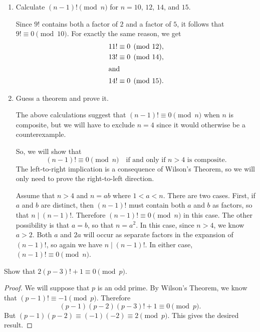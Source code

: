 \begin{enumerate}
\item Calculate $(n - 1)!\pmod{n}$ for $n = 10$, $12$, $14$, and $15$.
  \begin{solution}
    Since $9!$ contains both a factor of $2$ and a factor of $5$, it
    follows that $9!\equiv0\pmod{10}$. For exactly the same reason, we
    get
    \begin{align*}
      11!&\equiv0\pmod{12}, \\
      13!&\equiv0\pmod{14}, \\
      \intertext{and}
      14!&\equiv0\pmod{15}. \qedhere
    \end{align*}
  \end{solution}
\item Guess a theorem and prove it.
  \begin{solution}
    The above calculations suggest that $(n - 1)!\equiv0\pmod{n}$ when
    $n$ is composite, but we will have to exclude $n = 4$ since it
    would otherwise be a counterexample.

    So, we will show that
    \begin{equation*}
      (n - 1)!\equiv0\pmod{n}
      \quad\text{if and only if $n > 4$ is composite}.
    \end{equation*}
    The left-to-right implication is a consequence of Wilson's
    Theorem, so we will only need to prove the right-to-left
    direction.

    Assume that $n > 4$ and $n = ab$ where $1 < a < n$. There are two
    cases. First, if $a$ and $b$ are distinct, then $(n-1)!$ must
    contain both $a$ and $b$ as factors, so that $n\mid(n -
    1)!$. Therefore $(n-1)!\equiv0\pmod{n}$ in this case. The other
    possibility is that $a = b$, so that $n = a^2$. In this case,
    since $n > 4$, we know $a > 2$. Both $a$ and $2a$ will occur as
    separate factors in the expansion of $(n-1)!$, so again we have
    $n\mid(n-1)!$. In either case, $(n-1)!\equiv0\pmod{n}$.
  \end{solution}
\end{enumerate}

 Show that $2(p - 3)! + 1 \equiv 0 \pmod p$.
\begin{proof}
  We will suppose that $p$ is an odd prime. By Wilson's Theorem, we
  know that $(p - 1)!\equiv-1\pmod{p}$. Therefore
  \begin{equation*}
    (p - 1)(p - 2)(p - 3)! + 1 \equiv 0 \pmod{p}.
  \end{equation*}
  But $(p - 1)(p - 2)\equiv(-1)(-2)\equiv2\pmod{p}$. This gives the
  desired result.
\end{proof}

